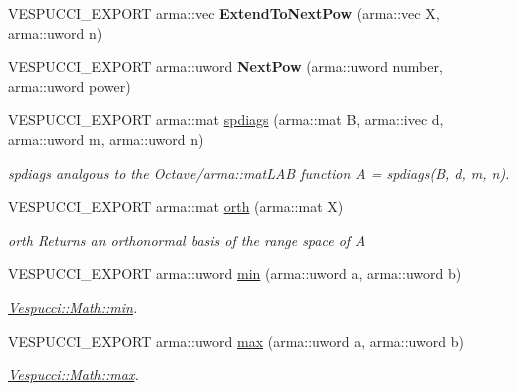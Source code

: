 \begin{DoxyCompactItemize}
\item 
V\+E\+S\+P\+U\+C\+C\+I\+\_\+\+E\+X\+P\+O\+RT arma\+::vec {\bfseries Extend\+To\+Next\+Pow} (arma\+::vec X, arma\+::uword n)\hypertarget{namespace_vespucci_1_1_math_aadc2b81e01a65a5de688088ca41791ce}{}\label{namespace_vespucci_1_1_math_aadc2b81e01a65a5de688088ca41791ce}

\item 
V\+E\+S\+P\+U\+C\+C\+I\+\_\+\+E\+X\+P\+O\+RT arma\+::uword {\bfseries Next\+Pow} (arma\+::uword number, arma\+::uword power)\hypertarget{namespace_vespucci_1_1_math_a979122c285b76d99e1cc430f8cd2fcd6}{}\label{namespace_vespucci_1_1_math_a979122c285b76d99e1cc430f8cd2fcd6}

\item 
V\+E\+S\+P\+U\+C\+C\+I\+\_\+\+E\+X\+P\+O\+RT arma\+::mat \hyperlink{namespace_vespucci_1_1_math_a3fecba29812be11a79fe7d9a2a88964e}{spdiags} (arma\+::mat B, arma\+::ivec d, arma\+::uword m, arma\+::uword n)
\begin{DoxyCompactList}\small\item\em spdiags analgous to the Octave/arma\+::mat\+L\+AB function A = spdiags(\+B, d, m, n). \end{DoxyCompactList}\item 
V\+E\+S\+P\+U\+C\+C\+I\+\_\+\+E\+X\+P\+O\+RT arma\+::mat \hyperlink{namespace_vespucci_1_1_math_a9ae51093bbdcdae2b8e6772d8951889c}{orth} (arma\+::mat X)
\begin{DoxyCompactList}\small\item\em orth Returns an orthonormal basis of the range space of A \end{DoxyCompactList}\item 
V\+E\+S\+P\+U\+C\+C\+I\+\_\+\+E\+X\+P\+O\+RT arma\+::uword \hyperlink{namespace_vespucci_1_1_math_a884dc00603c6aed8e2ee23988c429c64}{min} (arma\+::uword a, arma\+::uword b)
\begin{DoxyCompactList}\small\item\em \hyperlink{namespace_vespucci_1_1_math_a884dc00603c6aed8e2ee23988c429c64}{Vespucci\+::\+Math\+::min}. \end{DoxyCompactList}\item 
V\+E\+S\+P\+U\+C\+C\+I\+\_\+\+E\+X\+P\+O\+RT arma\+::uword \hyperlink{namespace_vespucci_1_1_math_a3d8f536b4465a4bacce89a51e3854daf}{max} (arma\+::uword a, arma\+::uword b)
\begin{DoxyCompactList}\small\item\em \hyperlink{namespace_vespucci_1_1_math_a3d8f536b4465a4bacce89a51e3854daf}{Vespucci\+::\+Math\+::max}. \end{DoxyCompactList}\item 

\end{DoxyCompactItemize}
